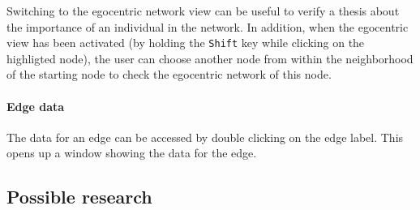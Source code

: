 Switching to the egocentric network view can be useful to verify a thesis about the importance of an individual in the network. In addition, when the egocentric view has been activated (by holding the \lstinline|Shift| key while clicking on the highligted node), the user can choose another node from within the neighborhood of the starting node to check the egocentric network of this node.

\paragraph{Edge data}

The data for an edge can be accessed by double clicking on the edge label. This opens up a window showing the data for the edge.


\subsection{Possible research}
\label{subsec:graph_research}
